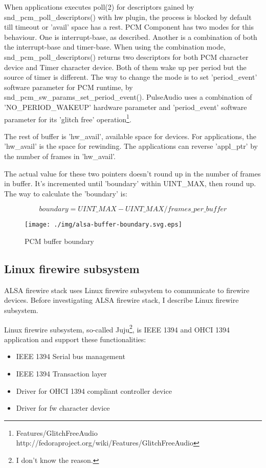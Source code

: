 \documentclass[onecolumn]{article}
\begin{document}
When applications executes poll(2) for descriptors gained by snd\_pcm\_poll\_descriptors() with hw plugin, the process is blocked by default till timeout or 'avail' space has a rest. PCM Component has two modes for this behaviour. One is interrupt-base, as described. Another is a combination of both the interrupt-base and timer-base. When using the combination mode, snd\_pcm\_poll\_descriptors() returns two descriptors for both PCM character device and Timer character device. Both of them wake up per period but the source of timer is different. The way to change the mode is to set 'period\_event' software parameter for PCM runtime, by snd\_pcm\_sw\_params\_set\_period\_event(). PulseAudio uses a combination of 'NO\_PERIOD\_WAKEUP' hardware parameter and 'period\_event' software parameter for its 'glitch free' operation\footnote{Features/GlitchFreeAudio http://fedoraproject.org/wiki/Features/GlitchFreeAudio}.

The rest of buffer is 'hw\_avail', available space for devices. For applications, the 'hw\_avail' is the space for rewinding. The applications can reverse 'appl\_ptr' by the number of frames in 'hw\_avail'.

The actual value for these two pointers doesn't round up in the number of frames in buffer. It's incremented until 'boundary' within UINT\_MAX, then round up. The way to calculate the 'boundary' is:

\begin{equation}
boundary = UINT\_MAX - UINT\_MAX / frames\_per\_buffer 
\end{equation}

\begin{figure}[H]
	\centering
	\texttt{[image: ./img/alsa-buffer-boundary.svg.eps]}
	\caption{{PCM buffer boundary}}
	\label{alsa--buffer-boundary}
\end{figure}


\subsection{Linux firewire subsystem}

ALSA firewire stack uses Linux firewire subsystem to communicate to firewire devices. Before investigating ALSA firewire stack, I describe Linux firewire subsystem.

Linux firewire subsystem, so-called Juju\footnote{I don't know the reason.}, is IEEE 1394 and OHCI 1394 application and support these functionalities:

\begin{itemize}
\item IEEE 1394 Serial bus management
\item IEEE 1394 Transaction layer
\item Driver for OHCI 1394 compliant controller device
\item Driver for fw character device
\end{itemize}
\end{document}

